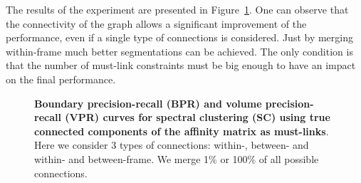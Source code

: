 The results of the experiment are presented in Figure~\ref{fig:aff_conn}. One can observe that the connectivity of the graph allows a significant improvement of the performance, even if a single type of connections is considered. 
Just by merging within-frame much better segmentations can be achieved. The only condition is that the number of must-link constraints must be big enough to have an impact on the final performance. 
\begin{figure}[htbp]
 \centering
{}
\quad

\caption[Boundary precision-recall (BPR) and volume precision-recall (VPR) curves for spectral clustering (SC) using true connected components of the affinity matrix as must-links]{
{\bf Boundary precision-recall (BPR) and volume precision-recall (VPR) curves for spectral clustering (SC) using true connected components of the affinity matrix as must-links}.
Here we consider 3 types of connections: within-, between- and within- and between-frame. We merge 1\% or 100\% of all possible connections.}
\label{fig:aff_conn}
\end{figure}
